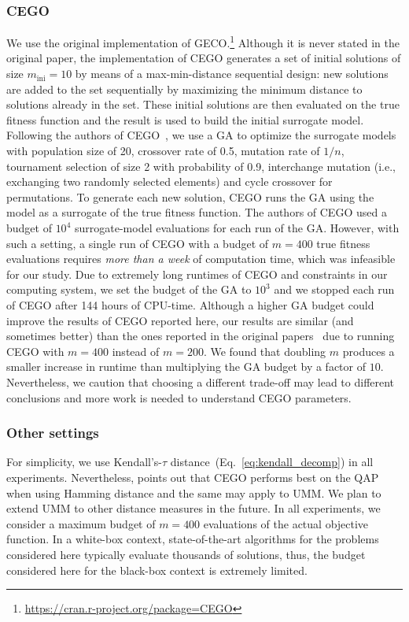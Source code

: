\documentclass[runningheads]{llncs}
\newcommand{\minit}{\ensuremath{m_\text{ini}}\xspace}
\newcommand{\FEmax}{\ensuremath{m}}
\begin{document}
\subsubsection{CEGO}
%
We use the original implementation of GECO.\footnote{\url{https://cran.r-project.org/package=CEGO}} %
Although it is never stated in the original paper, the implementation of CEGO
generates a set of initial solutions of size $\minit=10$ by means of a
max-min-distance sequential design: new solutions are added to the set
sequentially by maximizing the minimum distance to solutions already in the
set. These initial solutions are then evaluated on the true fitness function
and the result is used to build the initial surrogate
model. %
Following the authors of
CEGO~\citep{ZaeStoFriFisNauBar2014,ZaeStoBar2014:ppsn}, we use a GA to optimize
the surrogate models with population size of 20, crossover rate of 0.5,
mutation rate of $1/n$, tournament selection of size 2 with probability of 0.9,
interchange mutation (i.e., exchanging two randomly selected elements) and
cycle crossover for permutations. To generate each new solution, CEGO runs the
GA using the model as a surrogate of the true fitness function.  The authors of
CEGO used a budget of $10^4$ surrogate-model evaluations for each run of the
GA. However, with such a setting, a single run of CEGO with a budget of
$\FEmax=400$ true fitness evaluations requires \emph{more than a week} of
computation time, which was infeasible for our study. Due to extremely long
runtimes of CEGO and constraints in our computing system, we set the budget of
the GA to $10^3$ and we stopped each run of CEGO after 144 hours of CPU-time.
Although a higher GA budget could improve the results of CEGO reported here,
our results are similar (and sometimes better) than the ones reported in the
original papers~\citep{ZaeStoFriFisNauBar2014,ZaeStoBar2014:ppsn} due to
running CEGO with $\FEmax=400$ instead of $\FEmax=200$. We found that
doubling $\FEmax$ produces a smaller increase in runtime than multiplying the
GA budget by a factor of $10$. Nevertheless, we caution that choosing a
different trade-off may lead to different conclusions and more work is needed
to understand CEGO parameters.


\subsubsection{Other settings}
%
For simplicity, we use Kendall's-$\tau$
distance~(Eq.~\ref{eq:kendall_decomp}) in all experiments. Nevertheless,
\citet{ZaeStoFriFisNauBar2014} points out that CEGO performs best on the QAP
when using Hamming distance and the same may apply to UMM.
We plan to extend UMM to other distance measures in the future.  In all
experiments, we consider a maximum budget of $\FEmax=400$ evaluations of the
actual objective function. In a white-box context, state-of-the-art algorithms
for the problems considered here typically evaluate thousands of solutions,
thus, the budget considered here for the black-box context is extremely
limited.
\end{document}

